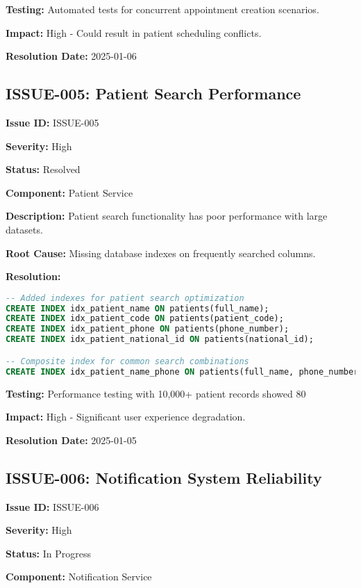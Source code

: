 \documentclass[12pt,a4paper]{article}
\begin{document}
\textbf{Testing:} Automated tests for concurrent appointment creation scenarios.

\textbf{Impact:} High - Could result in patient scheduling conflicts.

\textbf{Resolution Date:} 2025-01-06

\subsection{ISSUE-005: Patient Search Performance}

\textbf{Issue ID:} ISSUE-005

\textbf{Severity:} High

\textbf{Status:} Resolved

\textbf{Component:} Patient Service

\textbf{Description:} Patient search functionality has poor performance with large datasets.

\textbf{Root Cause:} Missing database indexes on frequently searched columns.

\textbf{Resolution:}
\begin{lstlisting}[language=SQL, caption=Database Index Creation]
-- Added indexes for patient search optimization
CREATE INDEX idx_patient_name ON patients(full_name);
CREATE INDEX idx_patient_code ON patients(patient_code);
CREATE INDEX idx_patient_phone ON patients(phone_number);
CREATE INDEX idx_patient_national_id ON patients(national_id);

-- Composite index for common search combinations
CREATE INDEX idx_patient_name_phone ON patients(full_name, phone_number);
\end{lstlisting}

\textbf{Testing:} Performance testing with 10,000+ patient records showed 80%

\textbf{Impact:} High - Significant user experience degradation.

\textbf{Resolution Date:} 2025-01-05

\subsection{ISSUE-006: Notification System Reliability}

\textbf{Issue ID:} ISSUE-006

\textbf{Severity:} High

\textbf{Status:} In Progress

\textbf{Component:} Notification Service
\end{document}
